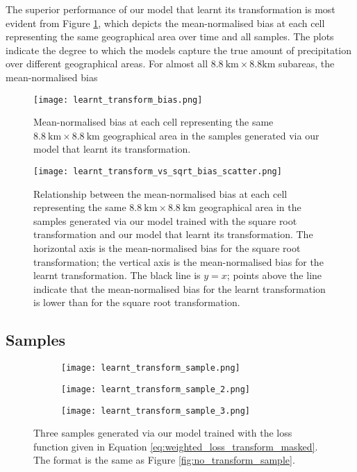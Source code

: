 \documentclass[ oneside,%
                    author={George Herbert},
                    degree={MSci},
                     title={Video Diffusion Models for Climate Simulations},
                  subtitle={}]{dissertation}
\begin{document}
The superior performance of our model that learnt its transformation is most evident from Figure \ref{fig:learnt_transform_bias}, which depicts the mean-normalised bias at each cell representing the same geographical area over time and all samples. The plots indicate the degree to which the models capture the true amount of precipitation over different geographical areas. For almost all $8.8\ \mathrm{km}\times 8.8 \mathrm{km}$ subareas, the mean-normalised bias 

\begin{figure}[htbp]
      \centering
      \texttt{[image: learnt\_transform\_bias.png]}
      \caption{Mean-normalised bias at each cell representing the same $8.8\ \mathrm{km}\times 8.8\ \mathrm{km}$ geographical area in the samples generated via our model that learnt its transformation.}
      \label{fig:learnt_transform_bias}
\end{figure}

\begin{figure}[htbp]
      \centering
      \texttt{[image: learnt\_transform\_vs\_sqrt\_bias\_scatter.png]}
      \caption{Relationship between the mean-normalised bias at each cell representing the same $8.8\ \mathrm{km}\times 8.8\ \mathrm{km}$ geographical area in the samples generated via our model trained with the square root transformation and our model that learnt its transformation. The horizontal axis is the mean-normalised bias for the square root transformation; the vertical axis is the mean-normalised bias for the learnt transformation. The black line is $y=x$; points above the line indicate that the mean-normalised bias for the learnt transformation is lower than for the square root transformation.}
      \label{fig:learnt_transform_vs_sqrt_bias_scatter}
\end{figure}




\subsection{Samples}

\begin{figure}[htbp]
      \centering
      \begin{subfigure}{\textwidth}
            \texttt{[image: learnt\_transform\_sample.png]}
      \end{subfigure}
      \begin{subfigure}{\textwidth}
            \texttt{[image: learnt\_transform\_sample\_2.png]}
      \end{subfigure}
      \begin{subfigure}{\textwidth}
            \texttt{[image: learnt\_transform\_sample\_3.png]}
      \end{subfigure}
      \caption{Three samples generated via our model trained with the loss function given in Equation \ref{eq:weighted_loss_transform_masked}. The format is the same as Figure \ref{fig:no_transform_sample}.}
      \label{fig:learnt_transform_sample}
\end{figure}
\end{document}
